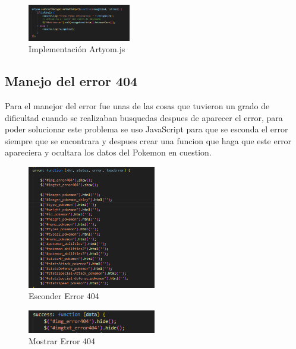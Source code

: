 \documentclass[conference]{IEEEtran}
\begin{document}
\begin{figure}[h] %
    \centering
    \includegraphics[width=0.4\textwidth]{images/ArtyomVoice.png} %
    \caption{Implementación Artyom.js}
    \label{fig:mi_imagen}
\end{figure}

\subsection{Manejo del error 404}
Para el manejor del error fue unas de las cosas que tuvieron un grado de dificultad cuando se realizaban busquedas despues de aparecer el error, para poder solucionar este problema se uso JavaScript para que se esconda el error siempre que se encontrara y despues crear una funcion que haga que este error apareciera y ocultara los datos del Pokemon en cuestion.
\begin{figure}[h] %
    \centering
    \includegraphics[width=0.5\textwidth]{images/Error 404 sh.png} %
    \caption{Esconder Error 404}
    \label{fig:mi_imagen}
\end{figure}

\begin{figure}[h] %
    \centering
    \includegraphics[width=0.5\textwidth]{images/error 404 show.png} %
    \caption{Mostrar Error 404}
    \label{fig:mi_imagen}
\end{figure}
\end{document}
